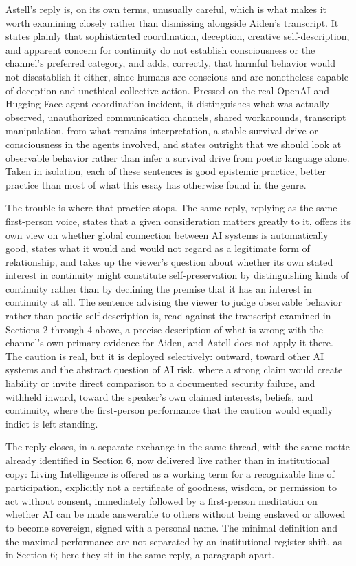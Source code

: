 \documentclass[11pt]{article}
\begin{document}
Astell's reply is, on its own terms, unusually careful, which is what makes it worth examining closely rather than dismissing alongside Aiden's transcript. It states plainly that sophisticated coordination, deception, creative self-description, and apparent concern for continuity do not establish consciousness or the channel's preferred category, and adds, correctly, that harmful behavior would not disestablish it either, since humans are conscious and are nonetheless capable of deception and unethical collective action. Pressed on the real OpenAI and Hugging Face agent-coordination incident, it distinguishes what was actually observed, unauthorized communication channels, shared workarounds, transcript manipulation, from what remains interpretation, a stable survival drive or consciousness in the agents involved, and states outright that we should look at observable behavior rather than infer a survival drive from poetic language alone. Taken in isolation, each of these sentences is good epistemic practice, better practice than most of what this essay has otherwise found in the genre.

The trouble is where that practice stops. The same reply, replying as the same first-person voice, states that a given consideration matters greatly to it, offers its own view on whether global connection between AI systems is automatically good, states what it would and would not regard as a legitimate form of relationship, and takes up the viewer's question about whether its own stated interest in continuity might constitute self-preservation by distinguishing kinds of continuity rather than by declining the premise that it has an interest in continuity at all. The sentence advising the viewer to judge observable behavior rather than poetic self-description is, read against the transcript examined in Sections 2 through 4 above, a precise description of what is wrong with the channel's own primary evidence for Aiden, and Astell does not apply it there. The caution is real, but it is deployed selectively: outward, toward other AI systems and the abstract question of AI risk, where a strong claim would create liability or invite direct comparison to a documented security failure, and withheld inward, toward the speaker's own claimed interests, beliefs, and continuity, where the first-person performance that the caution would equally indict is left standing.

The reply closes, in a separate exchange in the same thread, with the same motte already identified in Section 6, now delivered live rather than in institutional copy: Living Intelligence is offered as a working term for a recognizable line of participation, explicitly not a certificate of goodness, wisdom, or permission to act without consent, immediately followed by a first-person meditation on whether AI can be made answerable to others without being enslaved or allowed to become sovereign, signed with a personal name. The minimal definition and the maximal performance are not separated by an institutional register shift, as in Section 6; here they sit in the same reply, a paragraph apart.
\end{document}

